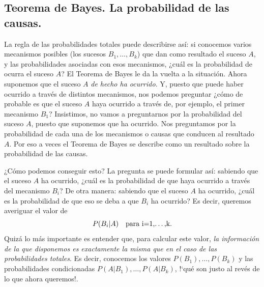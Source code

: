 \subsection{Teorema de Bayes. La probabilidad de las causas.}
\label{cap03:subsec:TeoremaBayesProbabilidadCausas}



La regla de las probabilidades totales puede describirse así: si conocemos varios mecanismos posibles (los sucesos $B_1,\ldots,B_k$) que dan como resultado el suceso $A$, y las probabilidades asociadas con esos mecanismos, ¿cuál es la probabilidad de ocurra el suceso $A$? El Teorema de Bayes le da la vuelta a la situación. Ahora suponemos que el suceso $A$ {\em de hecho ha ocurrido}.  Y, puesto que puede haber ocurrido a través de distintos mecanismos, nos podemos preguntar ¿cómo de probable es que el suceso $A$ haya ocurrido a través de, por ejemplo, el primer mecanismo $B_1$? Insistimos, no vamos a preguntarnos por la probabilidad del suceso $A$, puesto que suponemos que ha ocurrido. Nos preguntamos por la probabilidad de cada una de los mecanismos o causas que conducen al resultado $A$. Por eso a veces el Teorema de Bayes se describe como un resultado sobre la probabilidad de las causas.

¿Cómo podemos conseguir esto? La pregunta se puede formular así: sabiendo que el suceso $A$ ha ocurrido, ¿cuál es la probabilidad de que haya ocurrido a través del mecanismo $B_i$? De otra manera: sabiendo que el suceso $A$ ha ocurrido, ¿cuál es la probabilidad de que eso se deba a que $B_i$ ha ocurrido? Es decir, queremos averiguar el valor de
    \[P(B_i|A)\mbox{\quad para i=1,\ldots,k}.\]
Quizá lo más importante es entender que, para calcular este valor, {\em la información de la que disponemos es exactamente la misma que en el caso de las probabilidades totales}. Es decir, conocemos los valores $P(B_1),\ldots,P(B_k)$ y las probabilidades condicionadas $P(A|B_1),\ldots,P(A|B_k)$, {!`}qué son justo al revés de lo que ahora queremos!.

